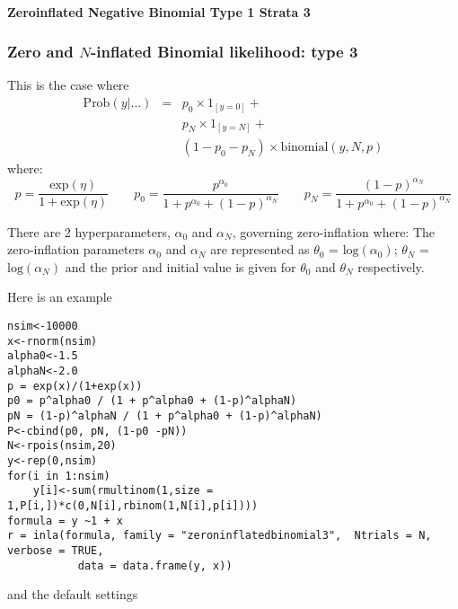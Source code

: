 \documentclass[a4paper,11pt]{article}
\begin{document}
\paragraph{Zeroinflated Negative Binomial Type 1 Strata 3}


\subsubsection{Zero and $N$-inflated Binomial likelihood: type 3}

This is the case where
\begin{eqnarray*}
  \mbox{Prob}(y|\ldots) &=& p_0 \times 1_{[y=0]}+\\
                        && p_N \times 1_{[y=N]}+\\
                        &&(1-p_0 - p_N) \times \mbox{binomial}(y,N,p)
\end{eqnarray*}
where:
\begin{displaymath}
    p = \frac{\mbox{exp}(\eta)}{1+\mbox{exp}(\eta)}\qquad
    p_0 = \frac{p^{\alpha_0}}{1+p^{\alpha_0}+(1-p)^{\alpha_N}}\qquad
    p_N = \frac{(1-p)^{\alpha_N}}{1+p^{\alpha_0}+(1-p)^{\alpha_N}}
\end{displaymath}

There are 2 hyperparameters, $\alpha_0$ and $\alpha_N$, governing
zero-inflation where: The zero-inflation parameters $\alpha_0$ and
$\alpha_N$ are represented as $\theta_0$ = $\mbox{log}(\alpha_0)$;
$\theta_N$ = $\mbox{log}(\alpha_N)$ and the prior and initial value is
given for $\theta_0$ and $\theta_N$ respectively.

Here is an example
\begin{verbatim}
nsim<-10000
x<-rnorm(nsim)
alpha0<-1.5
alphaN<-2.0
p = exp(x)/(1+exp(x))
p0 = p^alpha0 / (1 + p^alpha0 + (1-p)^alphaN)
pN = (1-p)^alphaN / (1 + p^alpha0 + (1-p)^alphaN)
P<-cbind(p0, pN, (1-p0 -pN))
N<-rpois(nsim,20)
y<-rep(0,nsim)
for(i in 1:nsim)
    y[i]<-sum(rmultinom(1,size = 1,P[i,])*c(0,N[i],rbinom(1,N[i],p[i])))
formula = y ~1 + x  
r = inla(formula, family = "zeroninflatedbinomial3",  Ntrials = N, verbose = TRUE,
           data = data.frame(y, x))
\end{verbatim}
and the default settings

\end{document}
